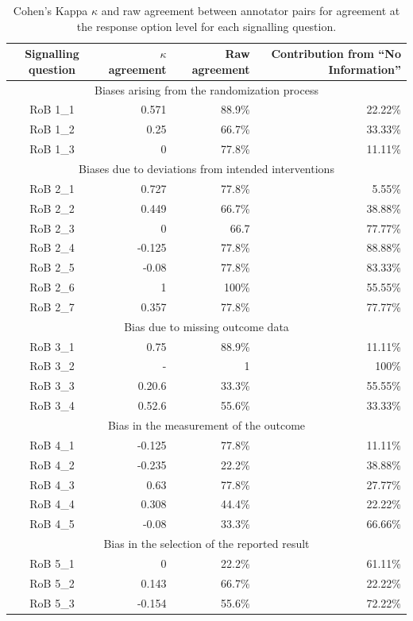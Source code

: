 \documentclass[sn-mathphys,Numbered]{sn-jnl}%
\theoremstyle{thmstyleone}%
\theoremstyle{thmstyletwo}%
\theoremstyle{thmstylethree}%
\begin{document}
%
%
%
\begin{table}[]
    \caption{Cohen's Kappa $\kappa$ and raw agreement between annotator pairs for agreement at the response option level for each signalling question.}
    \label{tab:IAA_response}
    \begin{tabular}{crrr}
    \toprule[1.0pt]
        Signalling question & $\kappa$ agreement & Raw agreement & Contribution from ``No Information'' \\
    \midrule[1.0pt]
        \multicolumn{4}{c}{Biases arising from the randomization process} \\
        \hline
        RoB 1\_1 & 0.571 & 88.9\%  & 22.22\% \\
        RoB 1\_2 & 0.25 & 66.7\%  & 33.33\% \\
        RoB 1\_3 & 0 & 77.8\%  & 11.11\% \\
        \hline 
        \multicolumn{4}{c}{Biases due to deviations from intended interventions} \\
        \hline
        RoB 2\_1 & 0.727 & 77.8\%  & 5.55\% \\
        RoB 2\_2 & 0.449 & 66.7\%  & 38.88\% \\
        RoB 2\_3 & 0 & 66.7 & 77.77\% \\
        RoB 2\_4 & -0.125 & 77.8\%  & 88.88\% \\
        RoB 2\_5 & -0.08 & 77.8\%  & 83.33\% \\
        RoB 2\_6 & 1 & 100\%  & 55.55\% \\
        RoB 2\_7 & 0.357 & 77.8\%  & 77.77\% \\
        \hline
        \multicolumn{4}{c}{Bias due to missing outcome data} \\
        \hline
        RoB 3\_1 & 0.75 & 88.9\%  & 11.11\% \\
        RoB 3\_2 & - & 1 & 100\% \\
        RoB 3\_3 & 0.20.6 & 33.3\%  & 55.55\% \\
        RoB 3\_4 & 0.52.6 & 55.6\%  & 33.33\% \\
        \hline
        \multicolumn{4}{c}{Bias in the measurement of the outcome} \\
        \hline
        RoB 4\_1 & -0.125 & 77.8\%  & 11.11\% \\
        RoB 4\_2 & -0.235 & 22.2\%  & 38.88\% \\
        RoB 4\_3 & 0.63 & 77.8\%  & 27.77\% \\
        RoB 4\_4 & 0.308 & 44.4\%  & 22.22\% \\
        RoB 4\_5 & -0.08 & 33.3\%  & 66.66\% \\
        \hline
        \multicolumn{4}{c}{Bias in the selection of the reported result} \\
        \hline
        RoB 5\_1 & 0 & 22.2\%  & 61.11\% \\
        RoB 5\_2 & 0.143 & 66.7\%  & 22.22\% \\
        RoB 5\_3 & -0.154 & 55.6\%  & 72.22\% \\
    \bottomrule[1.0pt]
    \end{tabular}
\end{table}
\end{document}
